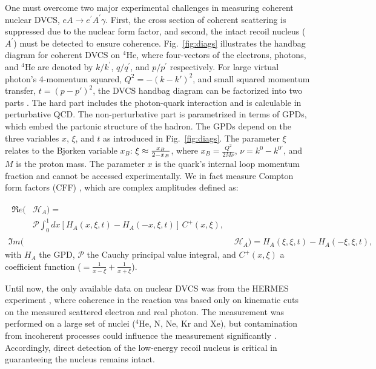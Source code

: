 \documentclass[twocolumn,nofootinbib,showpacs,prl,superscriptaddress,secnumarabic,amssymb,nobibnotes,aps,floatfix]{revtex4}
\begin{document}
One must overcome two major experimental challenges in measuring coherent 
nuclear DVCS, $eA\rightarrow e^\prime A^\prime\gamma$. First, the cross section 
of coherent scattering is suppressed due to the nuclear form factor, and 
second, the intact recoil nucleus ($A^\prime$) must be detected to ensure coherence.  
Fig.~\ref{fig:diags} illustrates the handbag diagram for coherent DVCS on 
$^4$He, where four-vectors of the electrons, photons, and $^4$He are denoted by
$k/k^\prime$, $q/q^\prime$, and $p/p^\prime$ respectively. For large virtual photon's 
4-momentum squared, $Q^2=-(k-k')^{2}$, and small squared momentum transfer, $t=(p-p')^{2}$, the DVCS handbag 
diagram can be factorized into two parts \cite{Freund_Collins,Ji_Osborne}. The 
hard part includes the photon-quark interaction and is calculable in 
perturbative QCD. The non-perturbative part is parametrized in terms of GPDs, 
which embed the partonic structure of the hadron. The GPDs depend on the three 
variables $x$, $\xi$, and $t$ as introduced in Fig.~\ref{fig:diags}. The 
parameter $\xi$ relates to the Bjorken variable $x_{B}$: $\xi\approx 
{{x_B}\over{2-x_B}}$, where $x_B=\frac{Q^2}{2M\nu}$, $\nu=k^0-k^{0\prime}$, and 
$M$ is the proton mass. The parameter $x$ is the quark's internal loop momentum 
fraction and cannot be accessed experimentally. We in fact measure 
Compton form factors (CFF) \cite{Guidal:2013rya}, which are
complex amplitudes defined as:

\begin{align}
\begin{split}
\Re e(&\mathcal{H}_{A}) = \\
    &\mathcal{P} 
\int_{0}^{1}dx[H_A(x,\xi,t)-H_A(-x,\xi,t)] \, C^{+}(x,\xi), 
\end{split} \\
\Im m(&\mathcal{H}_{A}) = H_A(\xi,\xi,t)-H_A(-\xi,\xi,t),
\end{align}
with $H_A$ the GPD, $\mathcal{P}$ 
the Cauchy principal value integral, and $C^{+}(x,\xi)$ a coefficient function 
($=  \frac{1}{x-\xi} + \frac{1}{x+\xi}$).

Until now, the only available data on nuclear DVCS was from the HERMES 
experiment \cite{Ellinghaus:2002zw}, where coherence in the reaction was based 
only on kinematic cuts on the measured scattered electron and real photon. The 
measurement was performed on a large set of nuclei ($^4$He, N, Ne, Kr and Xe), 
but contamination from incoherent processes could influence the
measurement significantly \cite{Guzey:2003jh}. Accordingly, direct detection 
of the low-energy recoil nucleus is critical in guaranteeing the nucleus 
remains intact. 
\end{document}
